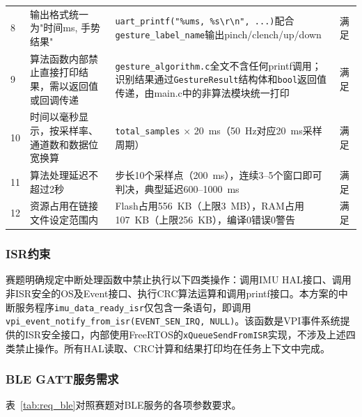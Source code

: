 \documentclass[lettersize,journal]{IEEEtran}
\begin{document}
\begin{table}[!t]
\begin{tabular}{p{0.5cm}p{5.5cm}p{8.5cm}p{1.2cm}}
        8 & 输出格式统一为"时间ms, 手势结果" & \texttt{uart\_printf("\%ums, \%s\textbackslash r\textbackslash n", ...)}配合\texttt{gesture\_label\_name}输出pinch/clench/up/down & 满足 \\
        9 & 算法函数内部禁止直接打印结果，需以返回值或回调传递 & \texttt{gesture\_algorithm.c}全文不含任何printf调用；识别结果通过\texttt{GestureResult}结构体和\texttt{bool}返回值传递，由main.c中的非算法模块统一打印 & 满足 \\
        10 & 时间以毫秒显示，按采样率、通道数和数据位宽换算 & \texttt{total\_samples} $\times$ 20~ms（50~Hz对应20~ms采样周期） & 满足 \\
        11 & 算法处理延迟不超过2秒 & 步长10个采样点（200~ms），连续3--5个窗口即可判决，典型延迟600--1000~ms & 满足 \\
        12 & 资源占用在链接文件设定范围内 & Flash占用556~KB（上限3~MB），RAM占用107~KB（上限256~KB），编译0错误0警告 & 满足 \\
        \bottomrule
    \end{tabular}
\end{table}

\subsubsection{ISR约束}

赛题明确规定中断处理函数中禁止执行以下四类操作：调用IMU HAL接口、调用非ISR安全的OS及Event接口、执行CRC算法运算和调用printf接口。本方案的中断服务程序\texttt{imu\_data\_ready\_isr}仅包含一条语句，即调用\texttt{vpi\_event\_notify\_from\_isr(EVENT\_SEN\_IRQ, NULL)}。该函数是VPI事件系统提供的ISR安全接口，内部使用FreeRTOS的\texttt{xQueueSendFromISR}实现，不涉及上述四类禁止操作。所有HAL读取、CRC计算和结果打印均在任务上下文中完成。

\subsubsection{BLE GATT服务需求}

表~\ref{tab:req_ble}对照赛题对BLE服务的各项参数要求。
\end{document}
